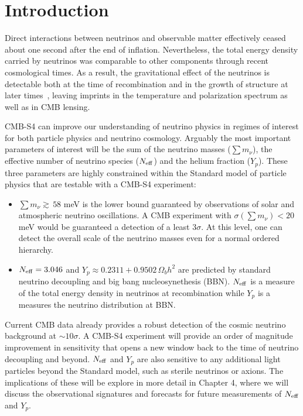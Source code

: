 \section{Introduction}



Direct interactions between neutrinos and observable matter effectively ceased about one second after the end of inflation.  Nevertheless, the total energy density carried by neutrinos was comparable to other components through recent cosmological times.  As a result, the gravitational effect of the neutrinos is detectable both at the time of recombination and in the growth of structure at later times~\cite{Abazajian:2013oma}, leaving imprints in the temperature and polarization spectrum as well as in CMB lensing.

CMB-S4 can improve our understanding of neutrino physics in regimes of interest for both particle physics and neutrino cosmology.  Arguably the most important parameters of interest will be the sum of the neutrino masses ($\sum m_\nu$), the effective number of neutrino species ($N_{\rm eff}$) and the helium fraction ($Y_p$).  These three parameters are highly constrained within the Standard model of particle physics that are testable with a CMB-S4 experiment:
\begin{itemize}
\item $ \sum m_\nu \gtrsim \, 58$ meV is the lower bound guaranteed by observations of solar and atmospheric neutrino oscillations.  A CMB experiment with $\sigma(\sum m_\nu) < 20$ meV would be guaranteed a detection of a least 3$\sigma$.  At this level, one can detect the overall scale of the neutrino masses even for a normal ordered hierarchy.
\item $N_{\rm eff} =  3.046$ and $Y_p \approx 0.2311 + 0.9502 \, \Omega_b h^2$ are predicted by standard neutrino decoupling and big bang nucleosynethesis (BBN).  $N_{\rm eff}$ is a measure of the total energy density in neutrinos at recombination while $Y_p$ is a measures the neutrino distribution at BBN. 
\end{itemize}
Current CMB data already provides a robust detection of the cosmic neutrino background at $\sim10 \sigma$.  A CMB-S4 experiment will provide an order of magnitude improvement in sensitivity that opens a new window back to the time of neutrino decoupling and beyond.  $N_{\rm eff}$ and $Y_p$ are also sensitive to any additional light particles beyond the Standard model, such as sterile neutrinos or axions.  The implications of these will be explore in more detail in Chapter 4, where we will discuss the observational signatures and forecasts for future measurements of $N_{\rm eff}$ and $Y_p$.  

